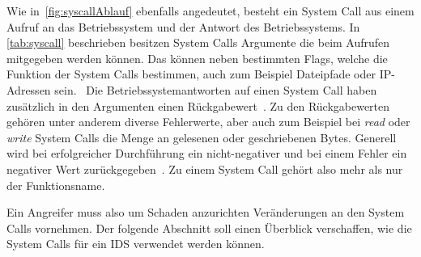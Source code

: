         Wie in~\autoref{fig:syscallAblauf} ebenfalls angedeutet, besteht ein System Call aus einem Aufruf an das Betriebssystem und der Antwort des Betriebssystems.
        In \autoref{tab:syscall} beschrieben besitzen System Calls Argumente die beim Aufrufen mitgegeben werden können.        
        Das können neben bestimmten Flags, welche die Funktion der System Calls bestimmen, auch zum Beispiel Dateipfade oder IP-Adressen sein.~\cite{SYSCALL_MANPAGE}
        Die Betriebssystemantworten auf einen System Call haben zusätzlich in den Argumenten einen Rückgabewert~.
        Zu den Rückgabewerten gehören unter anderem diverse Fehlerwerte, aber auch zum Beispiel bei \textit{read} oder \textit{write} System Calls die Menge an gelesenen oder geschriebenen Bytes.
        Generell wird bei erfolgreicher Durchführung ein nicht-negativer und bei einem Fehler ein negativer Wert zurückgegeben~\cite{SYSCALLBOOKMOONA2009}.
        Zu einem System Call gehört also mehr als nur der Funktionsname.


        Ein Angreifer muss also um Schaden anzurichten Veränderungen an den System Calls vornehmen.
        Der folgende Abschnitt soll einen Überblick verschaffen, wie die System Calls für ein \ac{IDS} verwendet werden können.

